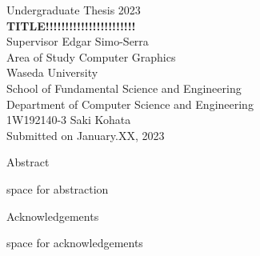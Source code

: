 \documentclass[a4paper, oneside, uplatex, 12pt]{book}
\begin{document}


\begin{titlepage}
\begin{center}
    \vspace{0.1\textheight}
    {\Large Undergraduate Thesis 2023} \\
    \vspace{0.05\textheight}
    \vspace{0.05\textheight}
    \textbf{\huge TITLE!!!!!!!!!!!!!!!!!!!!!!!} \\
    \vfill
    {\Large Supervisor \hspace{0.02\textwidth} Edgar Simo-Serra} \\
    {\Large Area of Study \hspace{0.02\textwidth} Computer Graphics} \\
    \vspace{0.05\textheight}
    {\Large 
        Waseda University \\
        School of Fundamental Science and Engineering \\
        Department of Computer Science and Engineering \\}
    \vspace{0.05\textheight}
    {\Large 1W192140-3 Saki Kohata \\}
    \vspace{0.05\textheight}
    {Submitted on January.XX, 2023}
\end{center}
\end{titlepage}
    

\pagebreak
\hspace{0pt}
\vfill %
    \begin{center}
    Abstract
    \end{center}
space for abstraction
\vfill
\pagebreak

\pagebreak
\hspace{0pt}
\vfill 
    \begin{center}
    Acknowledgements
    \end{center}
    space for acknowledgements
\end{document}

